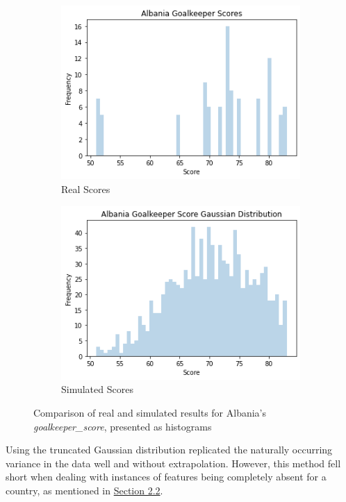\documentclass[8pt]{article}
\begin{document}
\begin{figure}[H]
        \centering
        \begin{subfigure}[b]{0.45\textwidth}
            \centering
            \includegraphics[scale=.4]{albania_scores.png}
            \caption{Real Scores}
        \end{subfigure}
        \hspace{0.5em}%
        \begin{subfigure}[b]{0.45\textwidth}
            \centering
            \includegraphics[scale=.4]{albania_gaussian.png}
            \caption{Simulated Scores}
        \end{subfigure}
        \caption{Comparison of real and simulated results for Albania's \textit{goalkeeper\_score}, presented as histograms}
        \label{fig:histograms}
\end{figure}
Using the truncated Gaussian distribution replicated the naturally occurring variance in the data well and without extrapolation. However, this method fell short when dealing with instances of features being completely absent for a country, as mentioned in \hyperref[sec:miss sec]{Section 2.2}.
\end{document}
